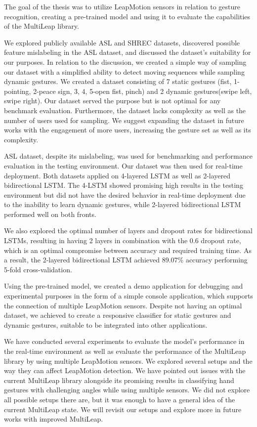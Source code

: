 The goal of the thesis was to utilize LeapMotion sensors in relation to gesture recognition, creating a pre-trained model and using it to evaluate the capabilities of the MultiLeap library.

We explored publicly available ASL and SHREC datasets, discovered possible feature mislabeling in the ASL dataset, and discussed the dataset's suitability for our purposes. In relation to the discussion, we created a simple way of sampling our dataset with a simplified ability to detect moving sequences while sampling dynamic gestures. We created a dataset consisting of 7 static gestures (fist, 1-pointing, 2-peace sign, 3, 4, 5-open fist, pinch) and 2 dynamic gestures(swipe left, swipe right). Our dataset served the purpose but is not optimal for any benchmark evaluation. Furthermore, the dataset lacks complexity as well as the number of users used for sampling. We suggest expanding the dataset in future works with the engagement of more users, increasing the gesture set as well as its complexity.

ASL dataset, despite its mislabeling, was used for benchmarking and performance evaluation in the testing environment. Our dataset was then used for real-time deployment. Both datasets applied on 4-layered LSTM as well as 2-layered bidirectional LSTM. The 4-LSTM showed promising high results in the testing environment but did not have the desired behavior in real-time deployment due to the inability to learn dynamic gestures, while 2-layered bidirectional LSTM performed well on both fronts. 

We also explored the optimal number of layers and dropout rates for bidirectional LSTMs, resulting in having 2 layers in combination with the 0.6 dropout rate, which is an optimal compromise between accuracy and required training time. As a result, the 2-layered bidirectional LSTM achieved 89.07\% accuracy performing 5-fold cross-validation.

Using the pre-trained model, we created a demo application for debugging and experimental purposes in the form of a simple console application, which supports the connection of multiple LeapMotion sensors. Despite not having an optimal dataset, we achieved to create a responsive classifier for static gestures and dynamic gestures, suitable to be integrated into other applications. 

We have conducted several experiments to evaluate the model's performance in the real-time environment as well as evaluate the performance of the MultiLeap library by using multiple LeapMotion sensors. We explored several setups and the way they can affect LeapMotion detection. We have pointed out issues with the current MultiLeap library alongside its promising results in classifying hand gestures with challenging angles while using multiple sensors. We did not explore all possible setups there are, but it was enough to have a general idea of the current MultiLeap state. We will revisit our setups and explore more in future works with improved MultiLeap.

